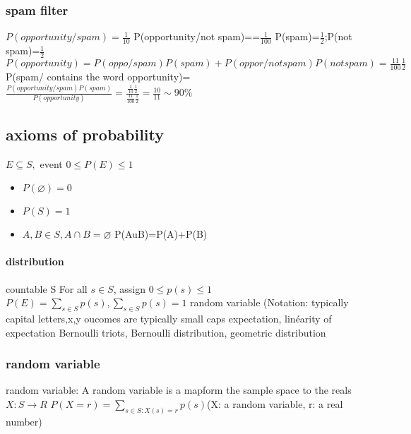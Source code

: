 \documentclass[a4paper,10pt]{article}
\begin{document}
\subsubsection{spam filter}
$P(opportunity/spam)=\frac{1}{10}$
\newline
P(opportunity/not spam)==$\frac{1}{100}$
\newline
P(spam)=$\frac{1}{2}$;P(not spam)=$\frac{1}{2}$
\newline
$P(opportunity)=P(oppo/spam)P(spam)+P(oppor/not spam)P(not spam)=\frac{11}{100}\frac{1}{2}$
\newline
P(spam/ contains the word opportunity)=$\frac{P(opportunity/spam)P(spam)}{P(opportunity)}=\frac{\frac{1}{10}\frac{1}{2}}{\frac{11}{100}\frac{1}{2}}=\frac{10}{11}\sim 90\%$
\subsection{axioms of probability}
$E\subseteq S,$ event
\newline
$0\leq P(E)\leq 1$
\begin{itemize}
 \item $P(\varnothing)=0$
 \item $P(S)=1$
 \item $A,B\in S,A\cap B=\varnothing$
 \newline
 P(AuB)=P(A)+P(B)
\end{itemize}
\paragraph{distribution}
countable S
\newline
For all $s\in S$, assign 
\newline
$0\leq p(s)\leq 1$
\newline
$P(E)=\sum_{s\in S}p(s),\sum_{s\in S}p(s)=1$
\newline
random variable (Notation: typically capital letters,x,y oucomes are typically small caps
\newline
expectation, linéarity of expectation
\newline
Bernoulli triots, Bernoulli distribution, geometric distribution
\subsubsection{random variable}
random variable: A random variable is a mapform the sample space to the reals $X:S\to R$
\newline
$P(X=r)= \sum_{s\in S:X(s)=r}p(s)$(X: a random variable, r: a real number)
\end{document}
